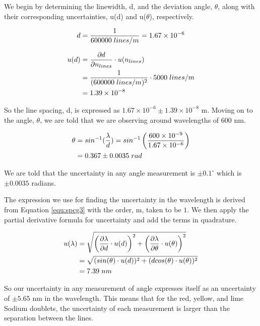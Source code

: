 \documentclass[justified]{tufte-book}
\begin{document}
\begin{enumerate}
We begin by determining the linewidth, d, and the deviation angle, $\theta$, along with their corresponding uncertainties, u(d) and u($\theta$), respectively.

\begin{equation}
d=\dfrac{1}{600000\hspace{1mm}lines/m}=1.67\times10^{-6}
\label{equ:spcg6}
\end{equation}



\begin{align}
u(d)&=\dfrac{\partial d}{\partial n_{lines}}\cdot u(n_{lines})\\
&=\dfrac{1}{(600000\hspace{1mm}lines/m)^2}\cdot 5000\hspace{1mm}lines/m\\
&=1.39\times10^{-8}
\label{equ:spcg7}
\end{align}

\noindent So the line spacing, d, is expressed as $1.67\times10^{-6}\pm1.39\times10^{-8}$ m. Moving on to the angle, $\theta$, we are told that we are observing around wavelengths of 600 nm.

\begin{align}
\theta&=sin^{-1}(\dfrac{\lambda}{d})=sin^{-1}\left(\dfrac{600\times10^{-9}}{1.67\times10^{-6}}\right)\\
&=0.367\pm 0.0035\hspace{1mm}rad
\label{equ:spcg8}
\end{align}

\noindent We are told that the uncertainty in any angle measurement is $\pm 0.1^{\circ}$ which is $\pm 0.0035$ radians.

The expression we use for finding the uncertainty in the wavelength is derived from Equation \ref{equ:spcg3} with the order, m, taken to be $1$. We then apply the partial derivative formula for uncertainty and add the terms in quadrature.

\begin{align}
u(\lambda)&=\sqrt{\left(\dfrac{\partial \lambda}{\partial d}\cdot u(d)\right)^2+\left(\dfrac{\partial \lambda}{\partial \theta}\cdot u(\theta)\right)^2}\\
&=\sqrt{(sin(\theta)\cdot u(d))^2+(dcos(\theta)\cdot u(\theta))^2}\\
&=7.39\hspace{1mm}nm
\label{equ:spcg9}
\end{align}

So our uncertainty in any measurement of angle expresses itself as an uncertainty of $\pm5.65$ nm in the wavelength. This means that for the red, yellow, and lime Sodium doublets, the uncertainty of each measurement is larger than the separation between the lines.

\end{enumerate}
\end{document}
